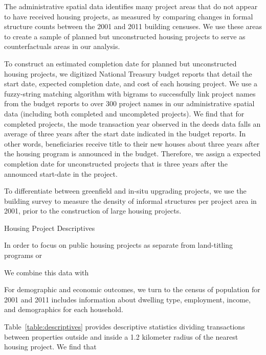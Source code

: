 \documentclass[12pt]{article}
\begin{document}
The administrative spatial data identifies many project areas that do not appear to have received housing projects, as measured by comparing changes in formal structure counts between the 2001 and 2011 building censuses.  We use these areas to create a sample of planned but unconstructed housing projects to serve as counterfactuals areas in our analysis.

To construct an estimated completion date for planned but unconstructed housing projects, we digitized National Treasury budget reports that detail the start date, expected completion date, and cost of each housing project.  We use a fuzzy-string matching algorithm with bigrams to successfully link project names from the budget reports to over 300 project names in our administrative spatial data (including both completed and uncompleted projects).  We find that for completed projects, the mode transaction year observed in the deeds data falls an average of three years after the start date indicated in the budget reports.  In other words, beneficiaries receive title to their new houses about three years after the housing program is announced in the budget.  Therefore, we assign a expected completion date for unconstructed projects that is three years after the announced start-date in the project.

To differentiate between greenfield and in-situ upgrading projects, we use the building survey to measure the density of informal structures per project area in 2001, prior to the construction of large housing projects.


\begin{table}
	\centering
	\caption{Housing Project Descriptives}\label{table:projectdescriptives}

\end{table}

In order to focus on public housing projects as separate from land-titling programs or 


We combine this data with 



For demographic and economic outcomes, we turn to the census of population for 2001 and 2011 includes information about dwelling type, employment, income, and demographics for each household. 




Table~\ref{table:descriptives} provides descriptive statistics dividing transactions between properties outside and inside a 1.2 kilometer radius of the nearest housing project.  We find that 
\end{document}
